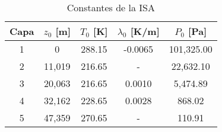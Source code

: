 \begin{table}[ht]
\centering
\begin{tabular}{ccccc}
\hline
\textbf{Capa} & \textbf{$z_0$ [m]} & \textbf{$T_0$ [K]} & \textbf{$\lambda_0$ [K/m]} & \textbf{$P_0$ [Pa]} \\
\hline
1 & 0 & 288.15 & -0.0065 & 101,325.00 \\
2 & 11,019 & 216.65 & - & 22,632.10 \\
3 & 20,063 & 216.65 & 0.0010 & 5,474.89 \\
4 & 32,162 & 228.65 & 0.0028 & 868.02 \\
5 & 47,359 & 270.65 & - & 110.91 \\
\hline
\end{tabular}
\caption{Constantes de la ISA}
\label{tab:constantes_ISA}
\end{table}
